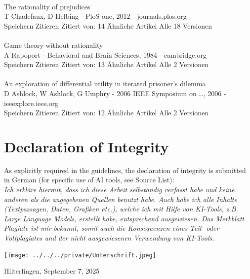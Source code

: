 \documentclass[11pt]{article}
\begin{document}
\\
\noindent 
The rationality of prejudices\\
T Chadefaux, D Helbing - PloS one, 2012 - journals.plos.org\\
Speichern Zitieren Zitiert von: 14 Ähnliche Artikel Alle 18 Versionen\\
\\
\noindent 
Game theory without rationality\\
A Rapoport - Behavioral and Brain Sciences, 1984 - cambridge.org\\
Speichern Zitieren Zitiert von: 13 Ähnliche Artikel Alle 2 Versionen\\
\\
\noindent 
An exploration of differential utility in iterated prisoner's dilemma\\
D Ashlock, W Ashlock, G Umphry - 2006 IEEE Symposium on …, 2006 - ieeexplore.ieee.org\\
Speichern Zitieren Zitiert von: 12 Ähnliche Artikel Alle 2 Versionen\\

\newpage
	
\section{Declaration of Integrity} \label{sec:declaration_of_integrity}

As explicitly required in the guidelines, the declaration of integrity is submitted in German (for specific use of AI tools, see Source List):\\

\noindent
\textit{
Ich erkläre hiermit, dass ich diese Arbeit selbständig verfasst habe und keine anderen als die angegebenen Quellen benutzt habe.
Auch habe ich alle Inhalte (Textpassagen, Daten, Grafiken etc.), welche ich mit Hilfe von KI-Tools, z.B. Large Language Models, erstellt habe, entsprechend ausgewiesen. 
Das Merkblatt Plagiate ist mir bekannt, somit auch die Konsequenzen eines Teil- oder Vollplagiates und der nicht ausgewiesenen Verwendung von KI-Tools.
}

\texttt{[image: ../../../private/Unterschrift.jpeg]}

\noindent
Hilterfingen, September 7, 2025
\end{document}
